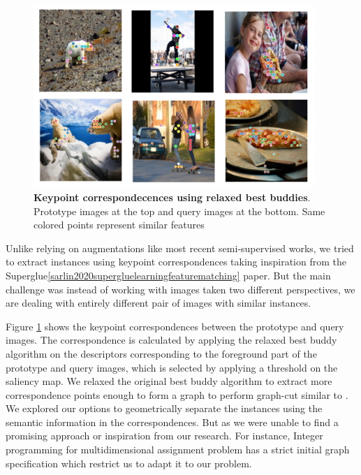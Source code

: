 %
\begin{figure}
	\centering
	\includegraphics[width=0.95\textwidth]{Images/main/correspondences.png}
	\caption[\textbf{Keypoint correspondecences using relaxed best buddies}]{\textbf{Keypoint correspondecences using relaxed best buddies}. Prototype images at the top and query images at the bottom. Same colored points represent similar features }
	\label{fig:correspondecences}
\end{figure}

Unlike relying on augmentations like most recent semi-supervised works, we tried to extract instances using keypoint correspondences taking inspiration from the Superglue\ref{sarlin2020supergluelearningfeaturematching} paper. But the main challenge was instead of working with images taken two different perspectives, we are dealing with entirely different pair of images with similar instances.

Figure \ref{fig:correspondecences} shows the keypoint correspondences between the prototype and query images. The correspondence is calculated by applying the relaxed best buddy algorithm on the descriptors corresponding to the foreground part of the prototype and query images, which is selected by applying a threshold on the saliency map. We relaxed the original best buddy algorithm \cite{Aberman_2018} to extract more correspondence points enough to form a graph to perform graph-cut similar to \cite{wang2022tokencut, sarlin2020supergluelearningfeaturematching}. We explored our options to geometrically separate the instances using the semantic information in the correspondences. But as we were unable to find a promising approach or inspiration from our research. For instance, Integer programming for multidimensional assignment problem \cite{WALTEROS2014553} has a strict initial graph specification which restrict us to adapt it to our problem.

